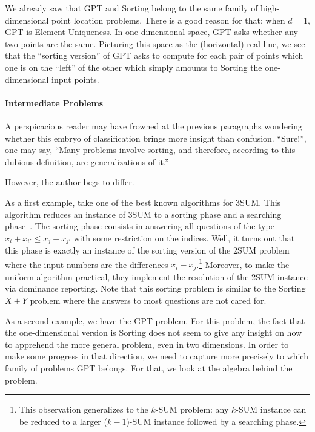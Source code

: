 We already saw that GPT and Sorting belong to the same family of
high-dimensional point location problems. There is a good reason for that: when
\(d=1\), GPT is Element Uniqueness. In one-dimensional space, GPT
asks whether any two points are the same. Picturing this space as
the (horizontal) real line, we see that the ``sorting version'' of GPT asks to
compute for each pair of points which one is on the ``left'' of the other which
simply amounts to Sorting the one-dimensional input points.



\paragraph{Intermediate Problems}
A perspicacious reader may have frowned at the previous paragraphs wondering
whether this embryo of classification brings more insight than confusion.
``Sure!'', one may say, ``Many problems involve sorting, and therefore,
according to this dubious definition, are generalizations of it.''

However, the author begs to differ.

As a first example, take one of the best known algorithms for 3SUM. This
algorithm reduces an instance of 3SUM to a sorting phase and a searching
phase~\cite{GP18}. The sorting phase consists in answering all questions of the type
\( x_i + x_{i'} \le x_j + x_{j'} \) with some restriction on the indices.
Well, it
turns out that this phase is exactly an instance of
the sorting version of the 2SUM problem where the input numbers are the
differences \(x_i - x_j\).\footnote{This observation generalizes to the \(k\)-SUM
problem: any \(k\)-SUM instance can be reduced to a larger (\(k-1\))-SUM instance
followed by a searching phase.} Moreover, to make the uniform algorithm
practical, they implement the resolution of the 2SUM instance via dominance
reporting.
Note that this sorting problem is similar to the Sorting \(X+Y\) problem where
the answers to most questions are not cared for.

As a second example, we have the GPT problem. For this problem, the fact that
the one-dimensional version is Sorting does not seem to give any insight on how
to apprehend the more general problem, even in two dimensions. In order to make
some progress in that direction, we need to capture more precisely to which
family of problems GPT belongs. For that, we look at the algebra behind the
problem.

